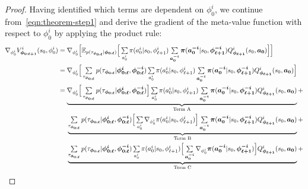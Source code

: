 \begin{proof}
Having identified which terms are dependent on $\phi^{i}_{0}$, we continue from~\cref{eqn:theorem-step1} and derive the gradient of the meta-value function with respect to $\phi^{i}_{0}$ by applying the product rule:
\begin{align}\label{eqn:theorem-step3}
\nabla_{\phi^{i}_{0}}V^{i}_{\bm{\phi}_{\bm{0:\ell+1}}}(s_0,\phi^{i}_{0})&=\nabla_{\phi^{i}_{0}}\Big[\mathbb{E}_{{p(\tau_{\bm{\phi}_{\bm{0:\ell}}}}|\bm{\phi}_{\bm{0:\ell}})}\Big[\smallsum_{a^{i}_{0}}\pi(a^{i}_{0}|s_0,\phi^{i}_{\ell+1})\smallsum_{\bm{a}^{\bm{-i}}_{\bm{0}}}\bm{\pi}(\bm{a}^{\bm{-i}}_{\bm{0}}|s_{0},\bm{\phi}^{\bm{-i}}_{\bm{\ell+1}}) Q^{i}_{\bm{\phi}_{\bm{\ell+1}}}(s_{0},\bm{a}_{\bm{0}})\Big]\Big]\nonumber\\
&=\nabla_{\phi^{i}_{0}}\Big[\smallsum_{\tau_{\bm{\phi}_{\bm{0:\ell}}}} p(\tau_{\bm{\phi}_{\bm{0:\ell}}}|\bm{\phi}^{\bm{i}}_{\bm{0:\ell}},\bm{\phi}^{\bm{-i}}_{\bm{0:\ell}})\smallsum_{a^{i}_{0}}\pi(a^{i}_{0}|s_0,\phi^{i}_{\ell+1})\smallsum_{\bm{a}^{\bm{-i}}_{\bm{0}}}\bm{\pi}(\bm{a}^{\bm{-i}}_{\bm{0}}|s_{0},\bm{\phi}^{\bm{-i}}_{\bm{\ell+1}}) Q^{i}_{\bm{\phi}_{\bm{\ell+1}}}(s_{0},\bm{a}_{\bm{0}})\Big]\nonumber\\
&=\underbrace{\nabla_{\phi^{i}_{0}}\Big[\smallsum_{\tau_{\bm{\phi}_{\bm{0:\ell}}}} p(\tau_{\bm{\phi}_{\bm{0:\ell}}}|\bm{\phi}^{\bm{i}}_{\bm{0:\ell}},\bm{\phi}^{\bm{-i}}_{\bm{0:\ell}})\Big]\smallsum_{a^{i}_{0}}\pi(a^{i}_{0}|s_0,\phi^{i}_{\ell+1})\smallsum_{\bm{a}^{\bm{-i}}_{\bm{0}}}\bm{\pi}(\bm{a}^{\bm{-i}}_{\bm{0}}|s_{0},\bm{\phi}^{\bm{-i}}_{\bm{\ell+1}}) Q^{i}_{\bm{\phi}_{\bm{\ell+1}}}(s_{0},\bm{a}_{\bm{0}})}_{\text{Term A}}+\nonumber\\
&\;\;\;\;\:\underbrace{\smallsum_{\tau_{\bm{\phi}_{\bm{0:\ell}}}} p(\tau_{\bm{\phi}_{\bm{0:\ell}}}|\bm{\phi}^{\bm{i}}_{\bm{0:\ell}},\bm{\phi}^{\bm{-i}}_{\bm{0:\ell}})\Big[\smallsum_{a^{i}_{0}}\nabla_{\phi^{i}_{0}}\pi(a^{i}_{0}|s_0,\phi^{i}_{\ell+1})\Big]\smallsum_{\bm{a}^{\bm{-i}}_{\bm{0}}}\bm{\pi}(\bm{a}^{\bm{-i}}_{\bm{0}}|s_{0},\bm{\phi}^{\bm{-i}}_{\bm{\ell+1}}) Q^{i}_{\bm{\phi}_{\bm{\ell+1}}}(s_{0},\bm{a}_{\bm{0}})}_{\text{Term B}}+\\
&\;\;\;\;\:\underbrace{\smallsum_{\tau_{\bm{\phi}_{\bm{0:\ell}}}} p(\tau_{\bm{\phi}_{\bm{0:\ell}}}|\bm{\phi}^{\bm{i}}_{\bm{0:\ell}},\bm{\phi}^{\bm{-i}}_{\bm{0:\ell}})\smallsum_{a^{i}_{0}}\pi(a^{i}_{0}|s_0,\phi^{i}_{\ell+1})\Big[\smallsum_{\bm{a}^{\bm{-i}}_{\bm{0}}}\nabla_{\phi^{i}_{0}}\bm{\pi}(\bm{a}^{\bm{-i}}_{\bm{0}}|s_{0},\bm{\phi}^{\bm{-i}}_{\bm{\ell+1}})\Big] Q^{i}_{\bm{\phi}_{\bm{\ell+1}}}(s_{0},\bm{a}_{\bm{0}})}_{\text{Term C}}+\nonumber\\

\end{align}
\end{proof}
